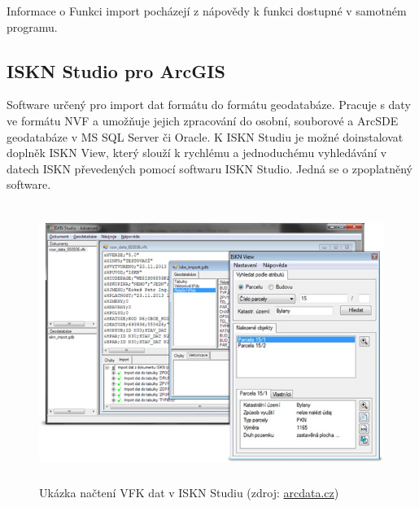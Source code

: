 Informace o Funkci import  pocházejí z nápovědy k funkci dostupné v samotném programu.
\subsection{ISKN Studio pro ArcGIS}
Software určený pro import dat formátu  do formátu geodatabáze. Pracuje s daty ve formátu NVF a umožňuje jejich zpracování do osobní, souborové a ArcSDE geodatabáze v MS SQL Server či Oracle. K ISKN Studiu je možné doinstalovat doplněk ISKN View, který slouží k rychlému a jednoduchému vyhledávání v datech ISKN převedených pomocí softwaru ISKN Studio. Jedná se o zpoplatněný software. \cite{arcgis}

\begin{figure}[H]
	 \centering
      \includegraphics[height=9cm]{./pictures/iskn_studio.jpeg}
      \caption{Ukázka načtení VFK dat v ISKN Studiu (zdroj:
\href{https://www.arcdata.cz/uploads/media/general/0001/01/68f0bfd90cf19d903a57fc8457e1f228a7dd47f4.jpeg}{arcdata.cz})}
      \label{fig:ISKNStudio}
  \end{figure}
